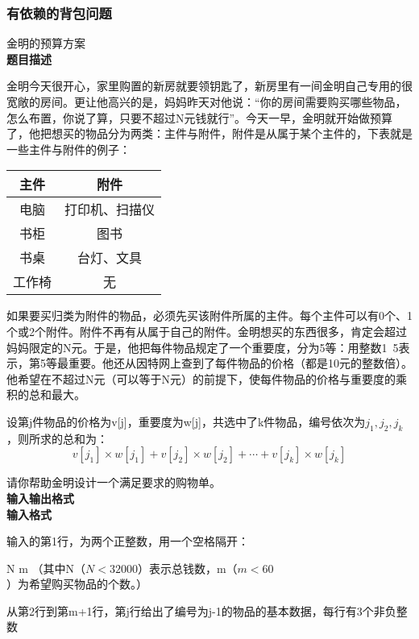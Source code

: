 \subsubsection{有依赖的背包问题}
\begin{example}金明的预算方案\\
	\textbf{题目描述}

	金明今天很开心，家里购置的新房就要领钥匙了，新房里有一间金明自己专用的很宽敞的房间。更让他高兴的是，妈妈昨天对他说：“你的房间需要购买哪些物品，怎么布置，你说了算，只要不超过N元钱就行”。今天一早，金明就开始做预算了，他把想买的物品分为两类：主件与附件，附件是从属于某个主件的，下表就是一些主件与附件的例子：
	\begin{center}
		\begin{tabular}{|c|c|}
			\hline
			主件   & 附件           \\
			\hline
			电脑   & 打印机、扫描仪 \\
			\hline
			书柜   & 图书           \\
			\hline
			书桌   & 台灯、文具     \\
			\hline
			工作椅 & 无             \\
			\hline
		\end{tabular}
	\end{center}

	如果要买归类为附件的物品，必须先买该附件所属的主件。每个主件可以有0个、1个或2个附件。附件不再有从属于自己的附件。金明想买的东西很多，肯定会超过妈妈限定的N元。于是，他把每件物品规定了一个重要度，分为5等：用整数1~5表示，第5等最重要。他还从因特网上查到了每件物品的价格（都是10元的整数倍）。他希望在不超过N元（可以等于N元）的前提下，使每件物品的价格与重要度的乘积的总和最大。

	设第j件物品的价格为v[j]，重要度为w[j]，共选中了k件物品，编号依次为$j_1,j_2,j_k$，则所求的总和为：
	\begin{equation*}
		v[j_1]\times w[j_1]+v[j_2]\times w[j_2]+ \cdots +v[j_k]\times w[j_k]
	\end{equation*}

	请你帮助金明设计一个满足要求的购物单。\\
	\textbf{输入输出格式}\\
	\textbf{输入格式}

	输入的第1行，为两个正整数，用一个空格隔开：

	N m （其中N（$N<32000$）表示总钱数，m（$m<60$）为希望购买物品的个数。）

	从第2行到第m+1行，第j行给出了编号为j-1的物品的基本数据，每行有3个非负整数


\end{example}
